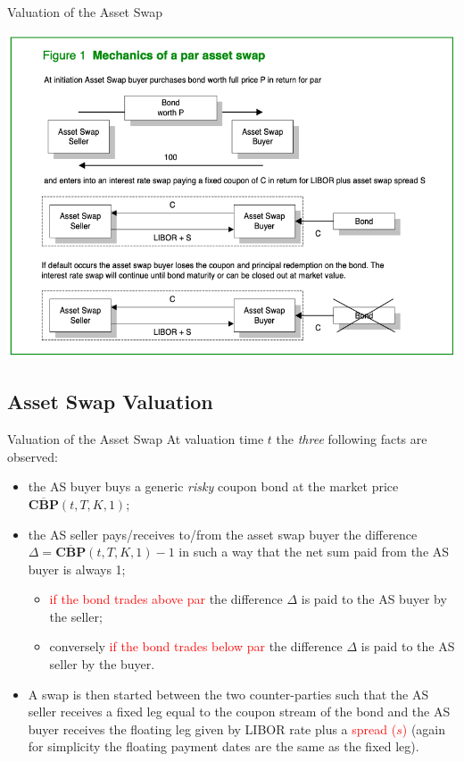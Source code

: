 \documentclass{beamer}
\begin{document}
\begin{frame}{Valuation of the Asset Swap}
	\begin{center}
		\includegraphics[width=0.7\linewidth]{asset_swap}
	\end{center}
\end{frame}

\subsection{Asset Swap Valuation}
\begin{frame}{Valuation of the Asset Swap}
	At valuation time $t$ the \emph{three} following facts are observed:
	\begin{itemize}
		\item<2-> the AS buyer buys a generic \emph{risky} coupon bond at the market price $\overline{\textbf{CBP}}(t,T,K,1)$;
		\item<3-> the AS seller pays/receives to/from the asset swap buyer the difference $\Delta = \overline{\textbf{CBP}}(t,T,K,1)-1$ in such a way that the net sum paid from the AS buyer is always 1; 
		\begin{itemize}
			\item \textcolor{red}{if the bond trades above par} the difference $\Delta$ is paid to the AS buyer by the seller;
			\item conversely \textcolor{red}{if the bond trades below par} the difference $\Delta$ is paid to the AS seller by the buyer.
		\end{itemize}
		\item<4-> A swap is then started between the two counter-parties such that the AS seller receives a fixed leg equal to the coupon stream of the bond and the AS buyer receives the floating leg given by LIBOR rate plus a \textcolor{red}{spread ($s$)} (again for simplicity the floating payment dates are the same as the fixed leg).
	\end{itemize}
\end{frame}
\end{document}
